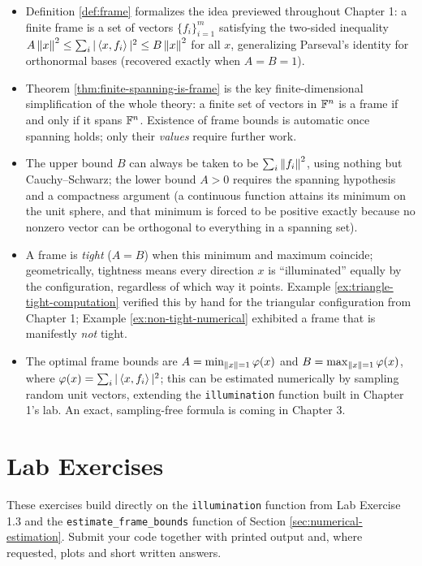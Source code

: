 \begin{itemize}
  \item Definition \ref{def:frame} formalizes the idea previewed throughout Chapter 1: a finite frame is a set of vectors $\{f_i\}_{i=1}^m$ satisfying the two-sided inequality $A\left\| x \right\|^2 \le \sum_i |\left\langle x, f_i \right\rangle|^2 \le B\left\| x \right\|^2$ for all $x$, generalizing Parseval's identity for orthonormal bases (recovered exactly when $A=B=1$).
  \item Theorem \ref{thm:finite-spanning-is-frame} is the key finite-dimensional simplification of the whole theory: a finite set of vectors in $\mathbb{F}^n$ is a frame if and only if it spans $\mathbb{F}^n$. Existence of frame bounds is automatic once spanning holds; only their \emph{values} require further work.
  \item The upper bound $B$ can always be taken to be $\sum_i \left\| f_i \right\|^2$, using nothing but Cauchy--Schwarz; the lower bound $A>0$ requires the spanning hypothesis and a compactness argument (a continuous function attains its minimum on the unit sphere, and that minimum is forced to be positive exactly because no nonzero vector can be orthogonal to everything in a spanning set).
  \item A frame is \emph{tight} ($A=B$) when this minimum and maximum coincide; geometrically, tightness means every direction $x$ is ``illuminated'' equally by the configuration, regardless of which way it points. Example \ref{ex:triangle-tight-computation} verified this by hand for the triangular configuration from Chapter 1; Example \ref{ex:non-tight-numerical} exhibited a frame that is manifestly \emph{not} tight.
  \item The optimal frame bounds are $A = \min_{\left\| x \right\|=1}\varphi(x)$ and $B = \max_{\left\| x \right\|=1}\varphi(x)$, where $\varphi(x) = \sum_i |\left\langle x, f_i \right\rangle|^2$; this can be estimated numerically by sampling random unit vectors, extending the \texttt{illumination} function built in Chapter 1's lab. An exact, sampling-free formula is coming in Chapter 3.
\end{itemize}

\section{Lab Exercises}
\label{sec:lab-ch2}

These exercises build directly on the \texttt{illumination} function from Lab Exercise 1.3 and the \texttt{estimate\_frame\_bounds} function of Section \ref{sec:numerical-estimation}. Submit your code together with printed output and, where requested, plots and short written answers.

